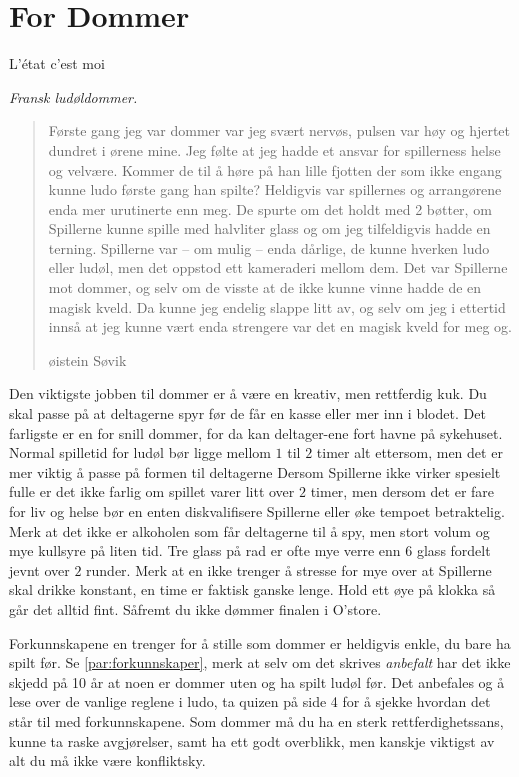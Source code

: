 \documentclass[10pt,a4paper,norsk,openany]{book}
\begin{document}
\chapter{For Dommer}

\epigraph{L'état c'est moi}{\textit{Fransk ludøldommer.}}

\blockquote[øistein Søvik]{%
  Første gang jeg var dommer var jeg svært nervøs, pulsen var høy og hjertet
  dundret i ørene mine. Jeg følte at jeg hadde et ansvar for spillerness helse
  og velvære. Kommer de til å høre på han lille fjotten der som ikke engang
  kunne ludo første gang han spilte? Heldigvis var spillernes og arrangørene
  enda mer urutinerte enn meg. De spurte om det holdt med 2 bøtter, om
  Spillerne kunne spille med halvliter glass og om jeg tilfeldigvis hadde en
  terning. Spillerne var -- om mulig -- enda dårlige, de kunne hverken ludo
  eller ludøl, men det oppstod ett kameraderi mellom dem. Det var Spillerne mot
  dommer, og selv om de visste at de ikke kunne vinne hadde de en magisk kveld.
  Da kunne jeg endelig slappe litt av, og selv om jeg i ettertid innså at jeg
  kunne vært enda strengere var det en magisk kveld for meg og. }


Den viktigste jobben til dommer er å være en kreativ, men rettferdig kuk. Du
skal passe på at deltagerne spyr før de får en kasse eller mer inn i blodet.
Det farligste er en for snill dommer, for da kan deltager-ene fort havne på
sykehuset. Normal spilletid for ludøl bør ligge mellom $1$ til $2$ timer alt
ettersom, men det er mer viktig å passe på formen til deltagerne Dersom
Spillerne ikke virker spesielt fulle er det ikke farlig om spillet varer litt
over $2$ timer, men dersom det er fare for liv og helse bør en enten
diskvalifisere Spillerne eller øke tempoet betraktelig. Merk at det ikke er
alkoholen som får deltagerne til å spy, men stort volum og mye kullsyre på
liten tid. Tre glass på rad er ofte mye verre enn 6 glass fordelt jevnt over $2$
runder. Merk at en ikke trenger å stresse for mye over at Spillerne skal drikke
konstant, en time er faktisk ganske lenge. Hold ett øye på klokka så går det
alltid fint. Såfremt du ikke dømmer finalen i O'store. 

Forkunnskapene en trenger for å stille som dommer er heldigvis enkle, du bare ha
spilt før. Se \cref{par:forkunnskaper}, merk at selv om det skrives
\emph{anbefalt} har det ikke skjedd på 10 år at noen er dommer uten og ha spilt
ludøl før. Det anbefales og å lese over de vanlige reglene i ludo, ta quizen på
side 4 for å sjekke hvordan det står til med forkunnskapene. Som dommer må du ha
en sterk rettferdighetssans, kunne ta raske avgjørelser, samt ha ett godt
overblikk, men kanskje viktigst av alt du må ikke være konfliktsky.
\end{document}

